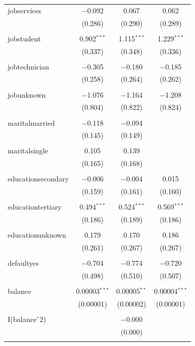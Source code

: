 \documentclass[11pt]{article}
\begin{document}
{\begin{longtable}{@{\extracolsep{5pt}}lccc}
 jobservices & $-$0.092 & 0.067 & 0.062 \\ 
  & (0.286) & (0.290) & (0.289) \\ 
  & & & \\ 
 jobstudent & 0.902$^{***}$ & 1.115$^{***}$ & 1.229$^{***}$ \\ 
  & (0.337) & (0.348) & (0.336) \\ 
  & & & \\ 
 jobtechnician & $-$0.305 & $-$0.180 & $-$0.185 \\ 
  & (0.258) & (0.264) & (0.262) \\ 
  & & & \\ 
 jobunknown & $-$1.076 & $-$1.164 & $-$1.208 \\ 
  & (0.804) & (0.822) & (0.824) \\ 
  & & & \\ 
 maritalmarried & $-$0.118 & $-$0.094 &  \\ 
  & (0.145) & (0.149) &  \\ 
  & & & \\ 
 maritalsingle & 0.105 & 0.139 &  \\ 
  & (0.165) & (0.168) &  \\ 
  & & & \\ 
 educationsecondary & $-$0.006 & $-$0.004 & 0.015 \\ 
  & (0.159) & (0.161) & (0.160) \\ 
  & & & \\ 
 educationtertiary & 0.494$^{***}$ & 0.524$^{***}$ & 0.569$^{***}$ \\ 
  & (0.186) & (0.189) & (0.186) \\ 
  & & & \\ 
 educationunknown & 0.179 & 0.170 & 0.186 \\ 
  & (0.261) & (0.267) & (0.267) \\ 
  & & & \\ 
 defaultyes & $-$0.704 & $-$0.774 & $-$0.720 \\ 
  & (0.498) & (0.510) & (0.507) \\ 
  & & & \\ 
 balance & 0.00003$^{***}$ & 0.00005$^{**}$ & 0.00004$^{***}$ \\ 
  & (0.00001) & (0.00002) & (0.00001) \\ 
  & & & \\ 
 I(balance$\hat{\mkern6mu}$2) &  & $-$0.000 &  \\ 
  &  & (0.000) &  \\ 
  & & & \\ 

\end{longtable}}
\end{document}
